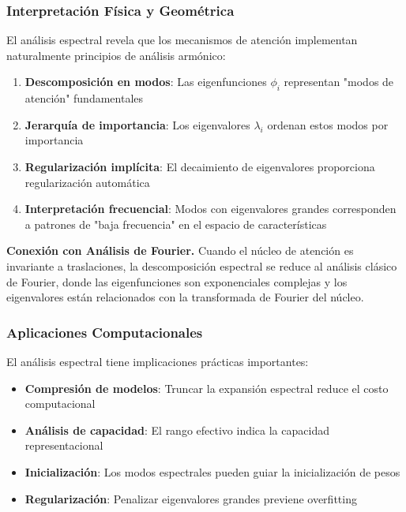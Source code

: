 \subsubsection{Interpretación Física y Geométrica}

El análisis espectral revela que los mecanismos de atención implementan naturalmente principios de análisis armónico:

\begin{enumerate}
    \item \textbf{Descomposición en modos}: Las eigenfunciones $\phi_i$ representan "modos de atención" fundamentales
    \item \textbf{Jerarquía de importancia}: Los eigenvalores $\lambda_i$ ordenan estos modos por importancia
    \item \textbf{Regularización implícita}: El decaimiento de eigenvalores proporciona regularización automática
    \item \textbf{Interpretación frecuencial}: Modos con eigenvalores grandes corresponden a patrones de "baja frecuencia" en el espacio de características
\end{enumerate}

\textbf{Conexión con Análisis de Fourier.}\label{rem:fourier_connection} Cuando el núcleo de atención es invariante a traslaciones, la descomposición espectral se reduce al análisis clásico de Fourier, donde las eigenfunciones son exponenciales complejas y los eigenvalores están relacionados con la transformada de Fourier del núcleo.

\subsubsection{Aplicaciones Computacionales}

El análisis espectral tiene implicaciones prácticas importantes:

\begin{itemize}
    \item \textbf{Compresión de modelos}: Truncar la expansión espectral reduce el costo computacional
    \item \textbf{Análisis de capacidad}: El rango efectivo indica la capacidad representacional
    \item \textbf{Inicialización}: Los modos espectrales pueden guiar la inicialización de pesos
    \item \textbf{Regularización}: Penalizar eigenvalores grandes previene overfitting
\end{itemize}

